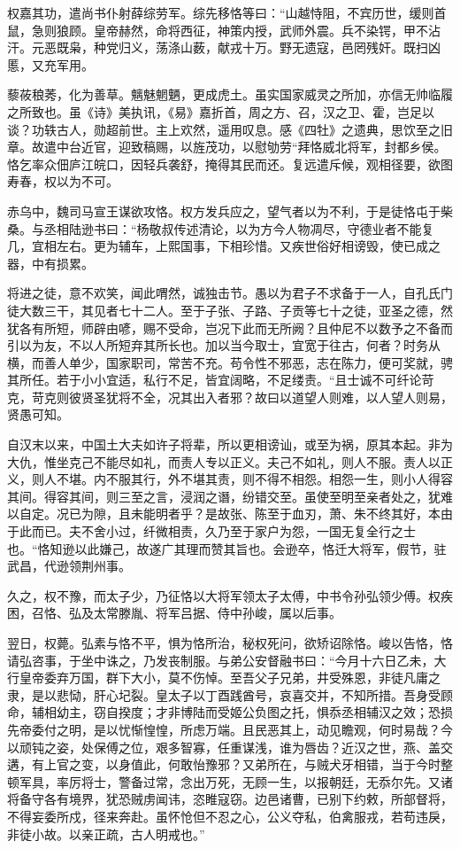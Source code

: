 \documentclass[12pt,UTF8]{ctexbook}
\begin{document}
权嘉其功，遣尚书仆射薛综劳军。综先移恪等曰：“山越恃阻，不宾历世，缓则首鼠，急则狼顾。皇帝赫然，命将西征，神策内授，武师外震。兵不染锷，甲不沾汗。元恶既枭，种党归义，荡涤山薮，献戎十万。野无遗寇，邑罔残奸。既扫凶慝，又充军用。

藜莜稂莠，化为善草。魑魅魍魉，更成虎土。虽实国家威灵之所加，亦信无帅临履之所致也。虽《诗》美执讯，《易》嘉折首，周之方、召，汉之卫、霍，岂足以谈？功轶古人，勋超前世。主上欢然，遥用叹息。感《四牡》之遗典，思饮至之旧章。故遣中台近官，迎致稿赐，以旌茂功，以慰劬劳“拜恪威北将军，封都乡侯。恪乞率众佃庐江皖口，因轻兵袭舒，掩得其民而还。复远遣斥候，观相径要，欲图寿春，权以为不可。

赤乌中，魏司马宣王谋欲攻恪。权方发兵应之，望气者以为不利，于是徒恪屯于柴桑。与丞相陆逊书曰：“杨敬叔传述清论，以为方今人物凋尽，守德业者不能复几，宜相左右。更为辅车，上熙国事，下相珍惜。又疾世俗好相谤毁，使已成之器，中有损累。

将进之徒，意不欢笑，闻此喟然，诚独击节。愚以为君子不求备于一人，自孔氏门徒大数三干，其见者七十二人。至于子张、子路、子贡等七十之徒，亚圣之德，然犹各有所短，师辟由喭，赐不受命，岂况下此而无所阙？且仲尼不以数予之不备而引以为友，不以人所短弃其所长也。加以当今取士，宜宽于往古，何者？时务从横，而善人单少，国家职司，常苦不充。苟令性不邪恶，志在陈力，便可奖就，骋其所任。若于小小宜适，私行不足，皆宜阔略，不足缕责。“且士诚不可纤论苛克，苛克则彼贤圣犹将不全，况其出入者邪？故曰以道望人则难，以人望人则易，贤愚可知。

自汉末以来，中国土大夫如许子将辈，所以更相谤讪，或至为祸，原其本起。非为大仇，惟坐克己不能尽如礼，而责人专以正义。夫己不如礼，则人不服。责人以正义，则人不堪。内不服其行，外不堪其责，则不得不相怨。相怨一生，则小人得容其间。得容其间，则三至之言，浸润之谮，纷错交至。虽使至明至亲者处之，犹难以自定。况已为隙，且未能明者乎？是故张、陈至于血刃，萧、朱不终其好，本由于此而已。夫不舍小过，纤微相责，久乃至于家户为怨，一国无复全行之士也。“恪知逊以此嫌己，故遂广其理而赞其旨也。会逊卒，恪迁大将军，假节，驻武昌，代逊领荆州事。

久之，权不豫，而太子少，乃征恪以大将军领太子太傅，中书令孙弘领少傅。权疾困，召恪、弘及太常滕胤、将军吕据、侍中孙峻，属以后事。

翌日，权薨。弘素与恪不平，惧为恪所治，秘权死问，欲矫诏除恪。峻以告恪，恪请弘咨事，于坐中诛之，乃发丧制服。与弟公安督融书曰：“今月十六日乙未，大行皇帝委弃万国，群下大小，莫不伤悼。至吾父子兄弟，井受殊恩，非徒凡庸之隶，是以悲恸，肝心圮裂。皇太子以丁酉践酋号，哀喜交并，不知所措。吾身受顾命，辅相幼主，窃自揆度；才非博陆而受姬公负图之托，惧忝丞相辅汉之效；恐损先帝委付之明，是以忧惭惶惶，所虑万端。且民恶其上，动见瞻观，何时易哉？今以顽钝之姿，处保傅之位，艰多智寡，任重谋浅，谁为唇齿？近汉之世，燕、盖交遘，有上官之变，以身值此，何敢怡豫邪？又弟所在，与贼犬牙相错，当于今时整顿军具，率厉将士，警备过常，念出万死，无顾一生，以报朝廷，无忝尔先。又诸将备守各有境界，犹恐贼虏闻讳，恣睢寇窃。边邑诸曹，已别下约敕，所部督将，不得妄委所戍，径来奔赴。虽怀怆但不忍之心，公义夺私，伯禽服戎，若苟违戾，非徒小故。以亲正疏，古人明戒也。”
\end{document}
